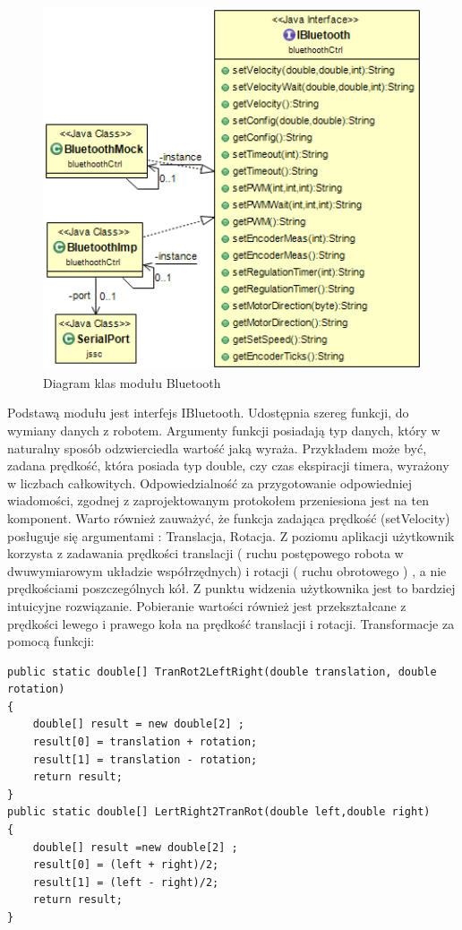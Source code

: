 \documentclass[eng,printmode]{mgr}
\begin{document}
   \begin{figure}[ht]
    \centering
    \includegraphics[width=1\textwidth]{images/bt}
    \caption{Diagram klas modułu Bluetooth}
    \label{fig:bt}
   \end{figure}

Podstawą modułu jest interfejs IBluetooth. Udostępnia szereg funkcji, do wymiany danych z robotem. Argumenty funkcji posiadają typ danych, który w naturalny sposób odzwierciedla wartość jaką wyraża. Przykładem może być, zadana prędkość, która posiada typ double, czy czas ekspiracji timera, wyrażony w liczbach całkowitych. Odpowiedzialność za przygotowanie odpowiedniej wiadomości, zgodnej z zaprojektowanym protokołem przeniesiona jest na ten komponent. Warto również zauważyć, że funkcja zadająca prędkość (setVelocity) posługuje się argumentami : Translacja, Rotacja. Z poziomu aplikacji użytkownik korzysta z zadawania prędkości translacji ( ruchu postępowego robota w dwuwymiarowym układzie współrzędnych) i rotacji ( ruchu obrotowego ) , a nie prędkościami poszczególnych kół. Z punktu widzenia użytkownika jest to bardziej intuicyjne rozwiązanie. Pobieranie wartości również jest przekształcane z prędkości lewego i prawego koła na prędkość translacji i rotacji. Transformacje za pomocą funkcji:

\begin{lstlisting}[style=java]
public static double[] TranRot2LeftRight(double translation, double rotation)
{
	double[] result = new double[2] ;
	result[0] = translation + rotation;
	result[1] = translation - rotation;
	return result;
}	
public static double[] LertRight2TranRot(double left,double right)
{
	double[] result =new double[2] ;
	result[0] = (left + right)/2;
	result[1] = (left - right)/2;
	return result;
}

\end{lstlisting}
\end{document}
